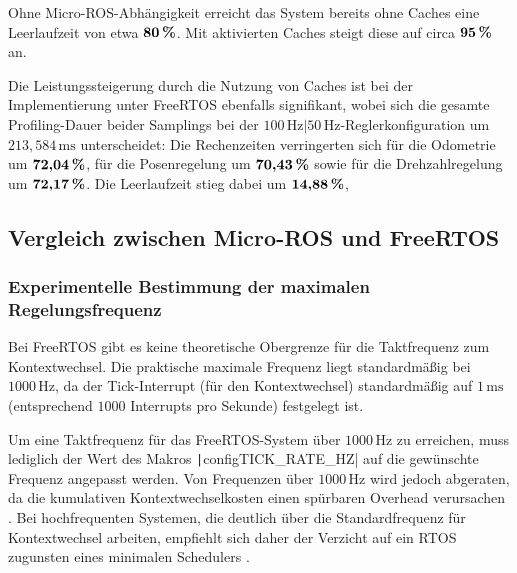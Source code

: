Ohne Micro-ROS-Abhängigkeit erreicht das System bereits ohne Caches eine
Leerlaufzeit von etwa $\textbf{80\,\%}$. Mit aktivierten Caches steigt diese auf
circa $\textbf{95\,\%}$ an.

Die Leistungssteigerung durch die Nutzung von Caches ist bei der Implementierung
unter FreeRTOS ebenfalls signifikant, wobei sich die gesamte Profiling-Dauer
beider Samplings bei der $100\,\text{Hz}|50\,\text{Hz}$-Reglerkonfiguration um
$213,584\,\text{ms}$ unterscheidet: Die Rechenzeiten verringerten sich für die
Odometrie um $\textbf{72,04\,\%}$, für die Posenregelung um $\textbf{70,43\,\%}$
sowie für die Drehzahlregelung um $\textbf{72,17\,\%}$. Die Leerlaufzeit stieg
dabei um $\textbf{14,88\,\%}$, 

\subsection{Vergleich zwischen Micro-ROS und FreeRTOS}

\subsubsection{Experimentelle Bestimmung der maximalen Regelungsfrequenz}

Bei FreeRTOS gibt es keine theoretische Obergrenze für die Taktfrequenz zum
Kontextwechsel. Die praktische maximale Frequenz liegt standardmäßig bei
$1000\,\text{Hz}$, da der Tick-Interrupt (für den Kontextwechsel) standardmäßig
auf $1\,\text{ms}$ (entsprechend $1000$ Interrupts pro Sekunde) festgelegt ist.

Um eine Taktfrequenz für das FreeRTOS-System über $1000\,\text{Hz}$ zu
erreichen, muss lediglich der Wert des Makros
\texttt|configTICK_RATE_HZ| auf die gewünschte Frequenz angepasst
werden. Von Frequenzen über $1000\,\text{Hz}$ wird jedoch abgeraten, da die
kumulativen Kontextwechselkosten einen spürbaren Overhead verursachen
\cite{FreertosTickRate2010}. Bei hochfrequenten Systemen, die deutlich über die
Standardfrequenz für Kontextwechsel arbeiten, empfiehlt sich daher der Verzicht
auf ein RTOS zugunsten eines minimalen Schedulers \cite{FreertosForumHF2019}.

